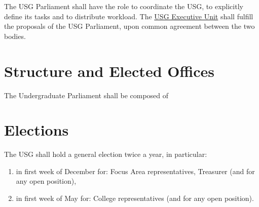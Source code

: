 \label{USGParliamentDef}
The USG Parliament shall have the role to coordinate the USG, to explicitly define its tasks and to distribute workload. The \hyperref[USGexecutiveUnitDef]{USG Executive Unit} shall fulfill the proposals of the USG Parliament, upon common agreement between the two bodies.

\section{Structure and Elected Offices} 
\label{ElectedOfficesDef}
The Undergraduate Parliament shall be composed of 

\section{Elections}
\label{electiontimes}
The USG shall hold a general election twice a year, in particular:
\begin{enumerate}

\item in first week of December for: Focus Area representatives, Treasurer (and for any open position),
\item in first week of May for: College representatives (and for any open position).
\end{enumerate}

